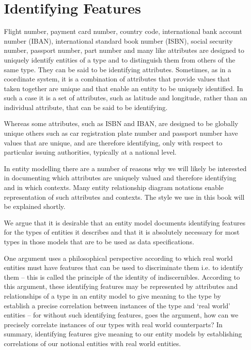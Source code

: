 \section{Identifying Features}
\label{IdentifyingFeatures}
\mynote
Flight number, payment card number, country code, international bank account number (IBAN), 
international standard book number (ISBN), social security number, passport number, part number and many like attributes are designed to uniquely identify entities of a type and to distinguish them from others of the same type. They can be said to be identifying attributes.
\mynote 
 Sometimes, as in a coordinate system, it is a combination of attributes 
 that provide values that taken together are unique and that enable an entity to be uniquely identified.  In such a case it is a set of attributes, such as latitude and longitude, rather than an individual attribute, that can be said to be identifying.

\mynote 
Whereas some attributes, such as ISBN and IBAN, are designed to be globally unique others such as 
car registration plate number and passport number have values that are unique, and are therefore identifying, only with respect to particular issuing authorities, typically at a national level.

\mynote
In entity modelling there are a number of reasons why we will likely be  interested in documenting
which attributes  are uniquely valued and therefore identifying and in which contexts. 
Many  entity 
relationship diagram notations enable representation of such attributes and contexts.
The style we use in this book will be explained shortly.

\mynote 
We argue that it is desirable that an entity model documents identifying features for the types of entities it describes and that it is absolutely necessary for most types in those models that are to be used as data specifications. 

\mynote 
One argument uses a philosophical perspective according to which real world entities must have features that can be used to discriminate them i.e. to identify them -- this is called the principle of the identity of indiscernibles. 
According to this argument, these identifying features may be 
represented by attributes and relationships of a type in an entity model to give meaning to the type
by establish a precise correlation between instances of the type and 
`real world' entities -- for without such identifying features, goes the argument, how can we precisely correlate instances of our types with real world counterparts?
In summary, identifying features give meaning to our entity models by establishing correlations of our notional entities with real world entities.

